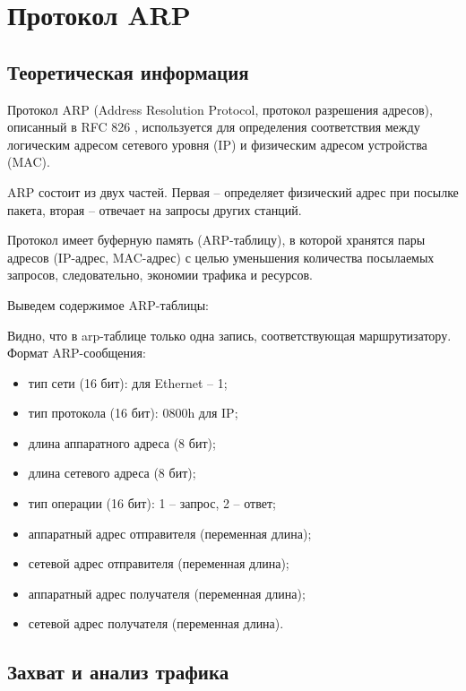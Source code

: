 \vspace{-1em}
\section{Протокол ARP}

\subsection{Теоретическая информация}

Протокол ARP (Address Resolution Protocol, протокол разрешения адресов), описанный в RFC 826 , используется для определения соответствия между логическим адресом сетевого уровня (IP) и физическим адресом устройства (MAC). 

ARP состоит из двух частей. Первая – определяет физический адрес при посылке пакета, вторая – отвечает на запросы других станций.

Протокол имеет буферную память (ARP-таблицу), в которой хранятся пары адресов (IP-адрес, MAC-адрес) с целью уменьшения количества посылаемых запросов, следовательно, экономии трафика и ресурсов.

Выведем содержимое ARP-таблицы:


Видно, что в arp-таблице только одна запись, соответствующая маршрутизатору.  Формат ARP-сообщения:

\begin{itemize}
	\item тип сети (16 бит): для Ethernet -- 1;
	\item тип протокола (16 бит): 0800h для IP;
	\item длина аппаратного адреса (8 бит);
	\item длина сетевого адреса (8 бит);
	\item тип операции (16 бит): 1 -- запрос, 2 -- ответ;
	\item аппаратный адрес отправителя (переменная длина);
	\item сетевой адрес отправителя (переменная длина);
	\item аппаратный адрес получателя (переменная длина);
	\item сетевой адрес получателя (переменная длина).
\end{itemize}

\subsection{Захват и анализ трафика}

